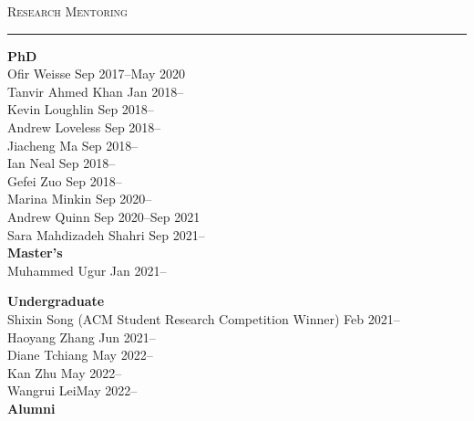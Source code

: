 \documentclass[10pt]{article}
\newcommand{\mysec}[1]{\vspace{2em}\textsc{\large #1}\vspace{1mm}\hrule\vspace{2mm}}
\newcommand{\mysub}[3]{\textbf{#1} {#2} \hfill {\em #3}}
\begin{document}
\mysec{Research Mentoring}
\mysub{PhD}{}{} \\
Ofir Weisse \hfill Sep 2017--May 2020 \\
Tanvir Ahmed Khan \hfill Jan 2018--\\
Kevin Loughlin \hfill Sep 2018-- \\
Andrew Loveless \hfill Sep 2018-- \\
Jiacheng Ma \hfill Sep 2018-- \\
Ian Neal \hfill Sep 2018-- \\
Gefei Zuo \hfill Sep 2018-- \\
Marina Minkin \hfill Sep 2020-- \\
Andrew Quinn \hfill Sep 2020--Sep 2021 \\
Sara Mahdizadeh Shahri \hfill Sep 2021-- \\

\mysub{Master's}{}{} \\
Muhammed Ugur \hfill Jan 2021--

\mysub{Undergraduate}{}{} \\
Shixin Song (ACM Student Research Competition Winner) \hfill Feb 2021-- \\
Haoyang Zhang \hfill Jun 2021--\\
Diane Tchiang \hfill May 2022--\\
Kan Zhu \hfill May 2022--\\
Wangrui Lei\hfill May 2022--\\

\mysub{Alumni}{}{} \\
\end{document}
